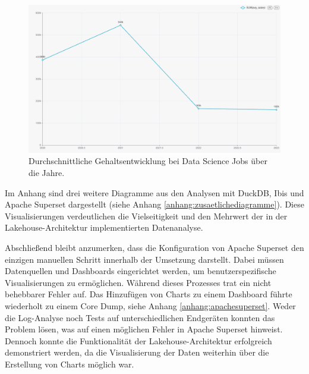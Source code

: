 \begin{figure}[H]
    \centering
    \includegraphics[width=0.8\linewidth]{graphics/salary-trend-year.jpg}
    \caption[Durchschnittliche Gehaltsentwicklung bei Data Science Jobs über die Jahre]{Durchschnittliche Gehaltsentwicklung bei Data Science Jobs über die Jahre.}
    \label{fig:Salary-over-years}
  \end{figure}

\newpage  

Im Anhang sind drei weitere Diagramme aus den Analysen mit DuckDB, Ibis und Apache Superset dargestellt (siehe Anhang \ref{anhang:zusaetlichediagramme}). Diese Visualisierungen verdeutlichen die Vielseitigkeit und den Mehrwert der in der Lakehouse-Architektur implementierten Datenanalyse.

Abschließend bleibt anzumerken, dass die Konfiguration von Apache Superset den einzigen manuellen Schritt innerhalb der Umsetzung darstellt. Dabei müssen Datenquellen und Dashboards eingerichtet werden, um benutzerspezifische Visualisierungen zu ermöglichen. Während dieses Prozesses trat ein nicht behebbarer Fehler auf. Das Hinzufügen von Charts zu einem Dashboard führte wiederholt zu einem Core Dump, siehe Anhang \ref{anhang:apachesuperset}. Weder die Log-Analyse noch Tests auf unterschiedlichen Endgeräten konnten das Problem lösen, was auf einen möglichen Fehler in Apache Superset hinweist. Dennoch konnte die Funktionalität der Lakehouse-Architektur erfolgreich demonstriert werden, da die Visualisierung der Daten weiterhin über die Erstellung von Charts möglich war.

